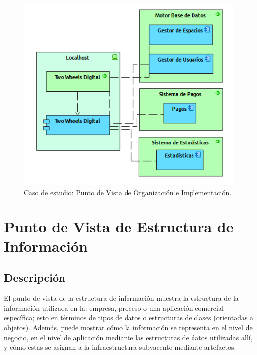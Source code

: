\begin{figure}[h]
	\centering
	\includegraphics[width=1.0\textwidth]{imagenes/Caso_Estudio/Tecnologia/organizacion_implementacion.PDF}
	\caption{Caso de estudio: Punto de Vista de Organización e Implementación.}
	\label{fig:gap_analysis}
\end{figure}


\section{Punto de Vista de Estructura de Información}
\subsection{Descripción}
El punto de vista de la estructura de información muestra la estructura de la información utilizada en la: empresa, proceso o una aplicación comercial específica; esto en términos de tipos de datos o estructuras de clases (orientadas a objetos). Además, puede mostrar cómo la información se representa en el nivel de negocio, en el nivel de aplicación mediante las estructuras de datos utilizadas allí, y cómo estas se asignan a la infraestructura subyacente mediante artefactos.

